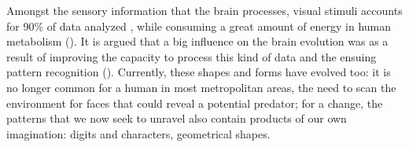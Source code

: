 \noindent Amongst the sensory information that the brain processes, visual stimuli accounts 
for 90\% of data analyzed \autocite{potter2014detecting}, while consuming a great amount of energy 
in human metabolism (\cite{phelps1981metabolic}). It is argued that a big influence on the 
brain evolution was as a result of improving the capacity to process this kind of data and the 
ensuing  pattern recognition (\cite{mattson2014superior}). 
Currently, these shapes and forms have evolved too: it is no longer common for a human in most 
metropolitan areas, the need to scan the environment for faces that could reveal a potential 
predator; for a change, the patterns that we now seek to unravel also contain products of our own 
imagination: digits and characters, geometrical shapes.\\


